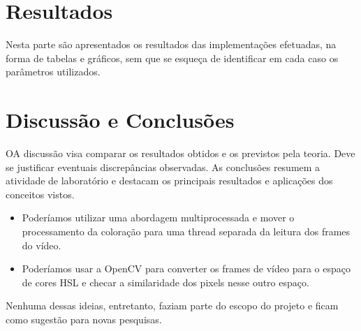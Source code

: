 \documentclass[conference]{IEEEtran}
\begin{document}
\section{Resultados}
Nesta parte são apresentados os resultados das implementações efetuadas, na forma de tabelas e gráficos, sem que se esqueça de identificar em cada caso os parâmetros utilizados.
\section{Discussão e Conclusões}
OA discussão visa comparar os resultados obtidos e os previstos pela teoria. Deve se justificar eventuais discrepâncias observadas. As conclusões resumem a atividade de laboratório e destacam os principais resultados e aplicações dos conceitos vistos.
\begin{itemize}
\item Poderíamos utilizar uma abordagem multiprocessada e mover o processamento da coloração para uma thread separada da leitura dos frames do vídeo.
\item Poderíamos usar a OpenCV para converter os frames de vídeo para o espaço de cores HSL e checar a similaridade dos pixels nesse outro espaço.
\end{itemize}
Nenhuma dessas ideias, entretanto, faziam parte do escopo do projeto e ficam como sugestão para novas pesquisas.



\end{document}
